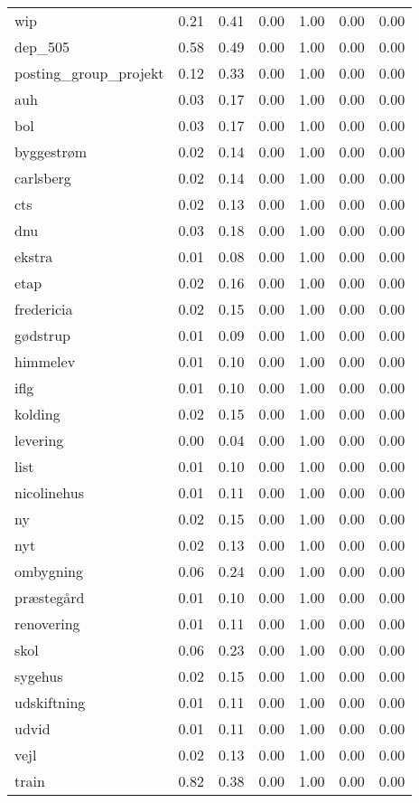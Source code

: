 \begin{landscape}
\begin{longtable}[h!]{lllllll}
wip & 0.21 & 0.41 & 0.00 & 1.00 & 0.00 & 0.00 \\
dep_505 & 0.58 & 0.49 & 0.00 & 1.00 & 0.00 & 0.00 \\
posting_group_projekt & 0.12 & 0.33 & 0.00 & 1.00 & 0.00 & 0.00 \\
auh & 0.03 & 0.17 & 0.00 & 1.00 & 0.00 & 0.00 \\
bol & 0.03 & 0.17 & 0.00 & 1.00 & 0.00 & 0.00 \\
byggestrøm & 0.02 & 0.14 & 0.00 & 1.00 & 0.00 & 0.00 \\
carlsberg & 0.02 & 0.14 & 0.00 & 1.00 & 0.00 & 0.00 \\
cts & 0.02 & 0.13 & 0.00 & 1.00 & 0.00 & 0.00 \\
dnu & 0.03 & 0.18 & 0.00 & 1.00 & 0.00 & 0.00 \\
ekstra & 0.01 & 0.08 & 0.00 & 1.00 & 0.00 & 0.00 \\
etap & 0.02 & 0.16 & 0.00 & 1.00 & 0.00 & 0.00 \\
fredericia & 0.02 & 0.15 & 0.00 & 1.00 & 0.00 & 0.00 \\
gødstrup & 0.01 & 0.09 & 0.00 & 1.00 & 0.00 & 0.00 \\
himmelev & 0.01 & 0.10 & 0.00 & 1.00 & 0.00 & 0.00 \\
iflg & 0.01 & 0.10 & 0.00 & 1.00 & 0.00 & 0.00 \\
kolding & 0.02 & 0.15 & 0.00 & 1.00 & 0.00 & 0.00 \\
levering & 0.00 & 0.04 & 0.00 & 1.00 & 0.00 & 0.00 \\
list & 0.01 & 0.10 & 0.00 & 1.00 & 0.00 & 0.00 \\
nicolinehus & 0.01 & 0.11 & 0.00 & 1.00 & 0.00 & 0.00 \\
ny & 0.02 & 0.15 & 0.00 & 1.00 & 0.00 & 0.00 \\
nyt & 0.02 & 0.13 & 0.00 & 1.00 & 0.00 & 0.00 \\
ombygning & 0.06 & 0.24 & 0.00 & 1.00 & 0.00 & 0.00 \\
præstegård & 0.01 & 0.10 & 0.00 & 1.00 & 0.00 & 0.00 \\
renovering & 0.01 & 0.11 & 0.00 & 1.00 & 0.00 & 0.00 \\
skol & 0.06 & 0.23 & 0.00 & 1.00 & 0.00 & 0.00 \\
sygehus & 0.02 & 0.15 & 0.00 & 1.00 & 0.00 & 0.00 \\
udskiftning & 0.01 & 0.11 & 0.00 & 1.00 & 0.00 & 0.00 \\
udvid & 0.01 & 0.11 & 0.00 & 1.00 & 0.00 & 0.00 \\
vejl & 0.02 & 0.13 & 0.00 & 1.00 & 0.00 & 0.00 \\
train & 0.82 & 0.38 & 0.00 & 1.00 & 0.00 & 0.00 \\
\end{longtable}\end{landscape}
